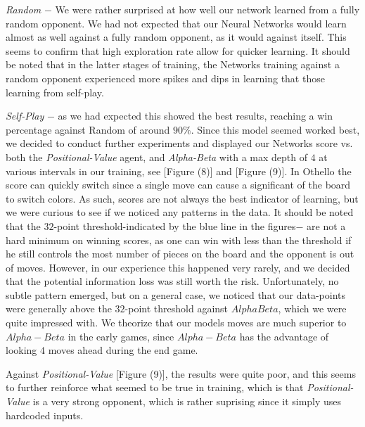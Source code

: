 \documentclass{sig-alternate-05-2015}
\begin{document}
\emph{Random} $-$ We were rather surprised at how well our network learned from a fully random opponent. We had not expected that our Neural Networks would learn almost as well against a fully random opponent, as it would against itself. This seems to confirm that high exploration rate allow for quicker learning. It should be noted that in the latter stages of training, the Networks training against a random opponent experienced more spikes and dips in learning that those learning from self-play.

\emph{Self-Play} $-$ as we had expected this showed the best results, reaching a win percentage against Random of around $90\%$. Since this model seemed worked best, we decided to conduct  further experiments and displayed our Networks score vs. both the \emph{Positional-Value} agent, and \emph{Alpha-Beta}  with a max depth of $4$ at various intervals in our training, see [Figure (8)] and [Figure (9)]. In Othello the score can quickly switch since a single move can cause a significant of the board to switch colors. As such, scores are not always the best indicator of learning, but we were curious to see if we noticed any patterns in the data. It should be noted that the $32$-point threshold-indicated by the blue line in the figures$-$ are not a hard minimum on winning scores, as one can win with less than the threshold if he still controls the most number of pieces on the board and the opponent is out of moves. However, in our experience this happened very rarely, and we decided that the potential information loss was still worth the risk. Unfortunately, no subtle pattern emerged, but on a general case, we noticed that our data-points were generally above the $32$-point threshold against $Alpha Beta$, which we were quite impressed with. We theorize that our models moves are much superior to $Alpha-Beta$ in the early games, since $Alpha-Beta$ has the advantage of looking $4$ moves ahead during the end game. 

	Against \emph{Positional-Value} [Figure (9)], the results were quite poor, and this seems to further reinforce what seemed to be true in training, which is that \emph{Positional-Value} is a very strong opponent, which is rather suprising since it simply uses hardcoded inputs.
\end{document}

